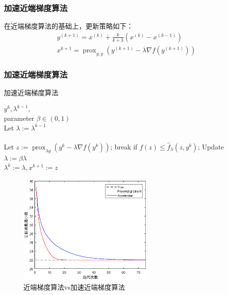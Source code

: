 \documentclass[10pt,aspectratio=43,mathserif,dvipsnames,svgnames,x11names]{beamer}
\begin{document}
	\begin{frame}[fragile]
	\frametitle{加速近端梯度算法}
	在近端梯度算法的基础上，更新策略如下：
$$\begin{array}{c}
y^{(k+1)}=x^{(k)}+\frac{k}{k+3}\left(x^{(k)}-x^{(k-1)}\right) \\
x^{k+1}=\operatorname{prox}_{g, y}\left(y^{(k+1)}-\lambda \nabla f\left(y^{(k+1)}\right)\right)
\end{array}$$
	\end{frame}
	\begin{frame}
		\frametitle{加速近端梯度算法}
		\begin{algorithm}[H]                           %
			\caption{加速近端梯度算法}         %
			\label{alg1}      %
			\begin{algorithmic}  %
				\Require
				$y^{k}, \lambda^{k-1},$\\
				parameter $\beta \in(0,1)$ \\
				Let $\lambda:=\lambda^{k-1}$\\
				\Repeat\\
				\State  Let $z:=\operatorname{prox}_{\lambda g}\left(y^{k}-\lambda \nabla f\left(y^{k}\right)\right)$;
				\State  break if $f(z) \leq \hat{f}_{\lambda}\left(z, y^{k}\right)$;
				\State Update $\lambda:=\beta \lambda$ \\
				\Return  $\lambda^{k}:=\lambda, x^{k+1}:=z$		
			\end{algorithmic}
		\end{algorithm}
	\end{frame}
	\begin{frame}
		\begin{figure}[H]
			\centering
			\includegraphics[width=0.6\textwidth]{1.eps}
			\caption{近端梯度算法vs加速近端梯度算法}
		\end{figure}
	\end{frame}
\end{document}
